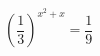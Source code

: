 \begin{ex}[type=equation]
	\begin{condition}
		\( \left( \dfrac{1}{3} \right)^{x^2+x}=\dfrac{1}{9} \)
	\end{condition}
\end{ex}